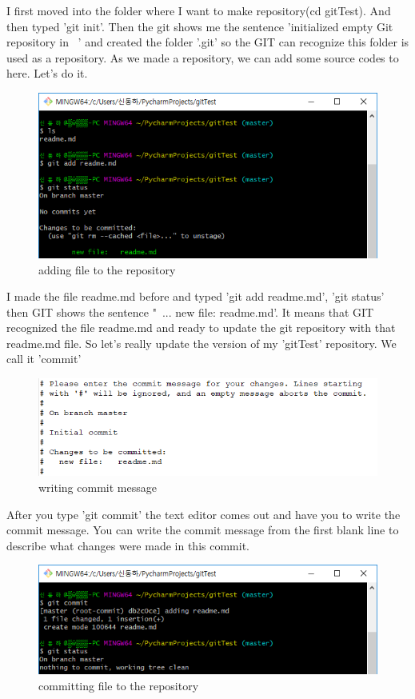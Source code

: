 \documentclass{article}
\begin{document}
I first moved into the folder where I want to make repository(cd gitTest). And then typed 'git init'. Then the git shows me the sentence 'initialized empty Git repository in ~' and created the folder '.git' so the GIT can recognize this folder is used as a repository. As we made a repository, we can add some source codes to here. Let's do it.
\begin{figure}[h]
\centering
\includegraphics[scale=0.75]{add.png}
\caption{adding file to the repository}
\label{fig:adding file to the repository}
\end{figure}

I made the file readme.md before and typed 'git add readme.md', 'git status' then GIT shows the sentence "~... new file: readme.md'. It means that GIT recognized the file readme.md and ready to update the git repository with that readme.md file. So let's really update the version of my 'gitTest' repository. We call it 'commit'
\begin{figure}[h]
\centering
\includegraphics[scale=0.73]{commit_message.png}
\caption{writing commit message}
\label{fig:writing commit message}
\end{figure}

After you type 'git commit' the text editor comes out and have you to write the commit message. You can write the commit message from the first blank line to describe what changes were made in this commit.
\begin{figure}[h]
\centering
\includegraphics[scale=0.75]{commit.png}
\caption{committing file to the repository}
\label{fig:committing file to the repository}
\end{figure}
\end{document}

